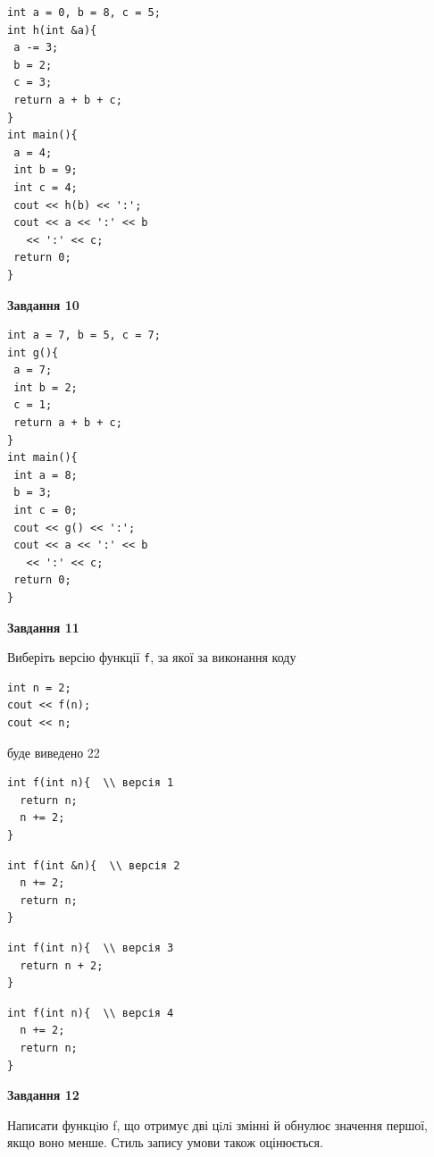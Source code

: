 \documentclass[12pt, ukrainian]{article}
\def\code#1{\Verb!#1!}
\begin{document}
{\begin {large}
\begin{minipage}[t]{7.0cm}
\begin{verbatim}
int a = 0, b = 8, c = 5;
int h(int &a){
 a -= 3;
 b = 2;
 c = 3;
 return a + b + c;
}
int main(){
 a = 4;
 int b = 9;
 int c = 4;
 cout << h(b) << ':';
 cout << a << ':' << b 
   << ':' << c;
 return 0;
}
\end{verbatim}



\begin{center}
\textbf{Завдання 10}
\end{center}
\vspace{-8mm}

\begin{verbatim}
int a = 7, b = 5, c = 7;
int g(){
 a = 7;
 int b = 2;
 c = 1;
 return a + b + c;
}
int main(){
 int a = 8;
 b = 3;
 int c = 0;
 cout << g() << ':';
 cout << a << ':' << b 
   << ':' << c;
 return 0;
}
\end{verbatim}

\end{minipage}
\vline \hspace{1mm}
\begin{minipage}[t]{11.0cm}

\begin{center}
\textbf{Завдання 11}
\end{center}
Виберіть версію функції \code{f}, за якої за виконання коду
\begin{verbatim}
int n = 2;
cout << f(n);
cout << n;
\end{verbatim}

буде виведено 22

\begin{verbatim}
int f(int n){  \\ версія 1
  return n;
  n += 2;
}
\end{verbatim}

\vspace{-8mm}\begin{verbatim}
int f(int &n){  \\ версія 2
  n += 2;
  return n;
}
\end{verbatim}

\vspace{-8mm}\begin{verbatim}
int f(int n){  \\ версія 3
  return n + 2;
}
\end{verbatim}

\vspace{-8mm}\begin{verbatim}
int f(int n){  \\ версія 4
  n += 2;
  return n;
}
\end{verbatim}



\begin{center}
\textbf{Завдання 12}
\end{center}

Написати функцiю f, що отримує дві цiлi змінні й обнулює значення першої, якщо воно менше. Стиль запису умови також оцінюється.\par

\end{minipage}

\end {large}}
\end{document}
